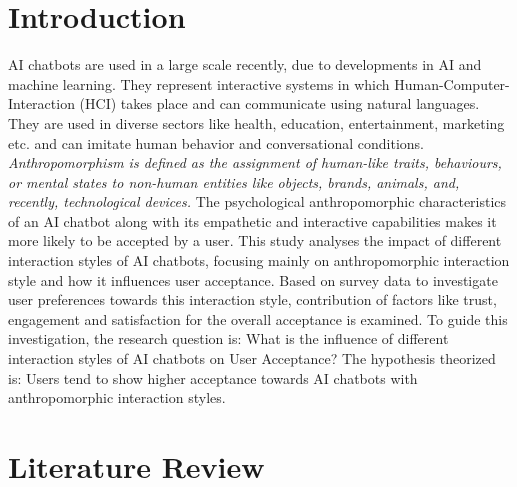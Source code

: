 \documentclass[conference]{IEEEtran}
\begin{document}
\section{Introduction}
AI chatbots are used in a large scale recently, due to developments in AI and machine learning. They represent interactive systems in which Human-Computer-Interaction (HCI) takes place and can communicate using natural languages. They are used in diverse sectors like health, education, entertainment, marketing etc. and can imitate human behavior and conversational conditions\cite{b1}. \textit{Anthropomorphism is defined as the assignment of human-like traits, behaviours, or mental states to non-human entities like objects, brands, animals, and, recently, technological devices.} The psychological anthropomorphic characteristics of an AI chatbot along with its empathetic and interactive capabilities makes it more likely to be accepted by a user\cite{b2}. This study analyses the impact of different interaction styles of AI chatbots, focusing mainly on anthropomorphic interaction style and how it influences user acceptance. Based on survey data to investigate user preferences towards this interaction style, contribution of factors like trust, engagement and satisfaction for the overall acceptance is examined. To guide this investigation, the research question is: What is the influence of different interaction styles of AI chatbots on User Acceptance? The hypothesis theorized is: Users tend to show higher acceptance towards AI chatbots with anthropomorphic interaction styles.

\section{Literature Review}
\end{document}
